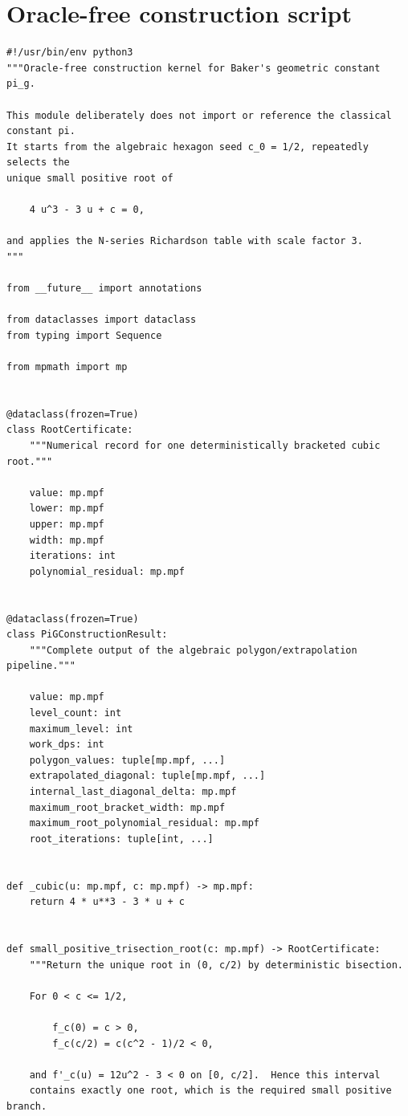 \documentclass[11pt]{article}
\begin{document}
\appendix
\section{Oracle-free construction script}
\begin{lstlisting}[style=pythonstyle,caption={\texttt{pi\_g\_construction.py}}]
#!/usr/bin/env python3
"""Oracle-free construction kernel for Baker's geometric constant pi_g.

This module deliberately does not import or reference the classical constant pi.
It starts from the algebraic hexagon seed c_0 = 1/2, repeatedly selects the
unique small positive root of

    4 u^3 - 3 u + c = 0,

and applies the N-series Richardson table with scale factor 3.
"""

from __future__ import annotations

from dataclasses import dataclass
from typing import Sequence

from mpmath import mp


@dataclass(frozen=True)
class RootCertificate:
    """Numerical record for one deterministically bracketed cubic root."""

    value: mp.mpf
    lower: mp.mpf
    upper: mp.mpf
    width: mp.mpf
    iterations: int
    polynomial_residual: mp.mpf


@dataclass(frozen=True)
class PiGConstructionResult:
    """Complete output of the algebraic polygon/extrapolation pipeline."""

    value: mp.mpf
    level_count: int
    maximum_level: int
    work_dps: int
    polygon_values: tuple[mp.mpf, ...]
    extrapolated_diagonal: tuple[mp.mpf, ...]
    internal_last_diagonal_delta: mp.mpf
    maximum_root_bracket_width: mp.mpf
    maximum_root_polynomial_residual: mp.mpf
    root_iterations: tuple[int, ...]


def _cubic(u: mp.mpf, c: mp.mpf) -> mp.mpf:
    return 4 * u**3 - 3 * u + c


def small_positive_trisection_root(c: mp.mpf) -> RootCertificate:
    """Return the unique root in (0, c/2) by deterministic bisection.

    For 0 < c <= 1/2,

        f_c(0) = c > 0,
        f_c(c/2) = c(c^2 - 1)/2 < 0,

    and f'_c(u) = 12u^2 - 3 < 0 on [0, c/2].  Hence this interval
    contains exactly one root, which is the required small positive branch.


\end{lstlisting}
\end{document}
